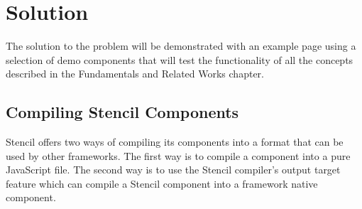 \chapter{Solution}
\label{cha:solution}
The solution to the problem will be demonstrated with an example page using a selection of demo components that will test the functionality of all the concepts described in the Fundamentals and Related Works chapter.
\section{Compiling Stencil Components}
Stencil offers two ways of compiling its components into a format that can be used by other frameworks. The first way is to compile a component into a pure JavaScript file. The second way is to use the Stencil compiler's output target feature which can compile a Stencil component into a framework native component.

